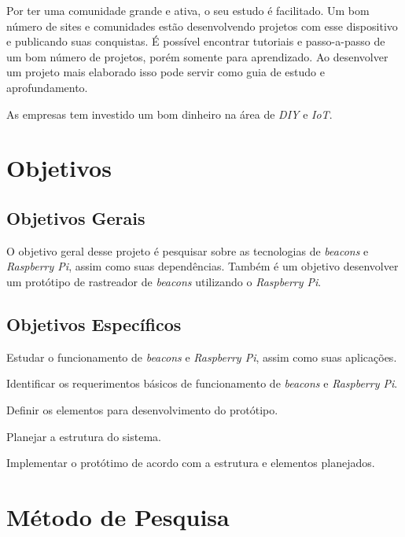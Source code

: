\documentclass[
	12pt,				%
	openright,			%
	oneside,			%
	a4paper,			%
	chapter=TITLE,		%
	english,			%
	french,				%
	spanish,			%
	brazil				%
	]{abntex2}
\begin{document}
{Por ter uma comunidade grande e ativa, o seu estudo é facilitado. Um bom número de sites e comunidades estão desenvolvendo projetos com esse dispositivo e publicando suas conquistas. É possível encontrar tutoriais e passo-a-passo de um bom número de projetos, porém somente para aprendizado. Ao desenvolver um projeto mais elaborado isso pode servir como guia de estudo e aprofundamento.

As empresas tem investido um bom dinheiro na área de \textit{DIY} e \textit{IoT}. 




\chapter{Objetivos}


\section{Objetivos Gerais}

O objetivo geral desse projeto é pesquisar sobre as tecnologias de \textit{beacons} e \textit{Raspberry Pi}, assim como suas dependências. Também é um objetivo desenvolver um protótipo de rastreador de \textit{beacons} utilizando o \textit{Raspberry Pi}.


\section{Objetivos Específicos}

\begin{alineas}
	\item Estudar o funcionamento de \textit{beacons} e \textit{Raspberry Pi}, assim como suas aplicações.
	\item Identificar os requerimentos básicos de funcionamento de \textit{beacons} e \textit{Raspberry Pi}.
	\item Definir os elementos para desenvolvimento do protótipo.
	\item Planejar a estrutura do sistema.
	\item Implementar o protótimo de acordo com a estrutura e elementos planejados.
\end{alineas}


\chapter{Método de Pesquisa}

}
\end{document}
